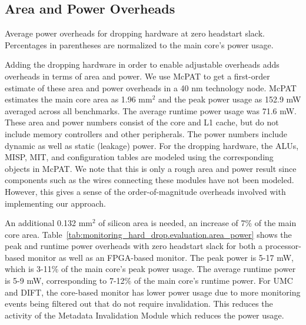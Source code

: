 \subsection{Area and Power Overheads}

\begin{table}[tb]
  \begin{center}
    \caption{Average power overheads for dropping hardware at zero headstart
    slack. Percentages in parentheses are normalized to the main core's power usage.}
    \begin{footnotesize}
    
    \end{footnotesize}
    \label{tab:monitoring_hard_drop.evaluation.area_power}
  \end{center}
\end{table}

Adding the dropping hardware in order to enable adjustable overheads adds
overheads in terms of area and power. We use McPAT \cite{mcpat-micro09} to get
a first-order estimate of these area and power overheads in a 40 nm technology
node. McPAT estimates the main core area as 1.96 mm$^2$ and the peak power
usage as 152.9 mW averaged across all benchmarks. The average runtime power
usage was 71.6 mW. These area and power numbers consist of the core and L1
cache, but do not include memory controllers and other peripherals. The power
numbers include dynamic as well as static (leakage) power. For the dropping
hardware, the ALUs, MISP, MIT, and configuration tables are modeled using the
corresponding objects in McPAT. We note that this is only a rough area and
power result since components such as the wires connecting these modules have
not been modeled. However, this gives a sense of the order-of-magnitude
overheads involved with implementing our approach.

An additional 0.132 mm$^2$ of silicon area is needed, an increase of 7\% of the
main core area. Table~\ref{tab:monitoring_hard_drop.evaluation.area_power}
shows the peak and runtime power overheads with zero headstart slack for both a
processor-based monitor as well as an FPGA-based monitor. The peak power is
5-17 mW, which is 3-11\% of the main core's peak power usage. The average
runtime power is 5-9 mW, corresponding to 7-12\% of the main core's runtime
power. For UMC and DIFT, the core-based monitor has lower power usage due to
more monitoring events being filtered out that do not require invalidation.
This reduces the activity of the Metadata Invalidation Module which reduces the
power usage.

